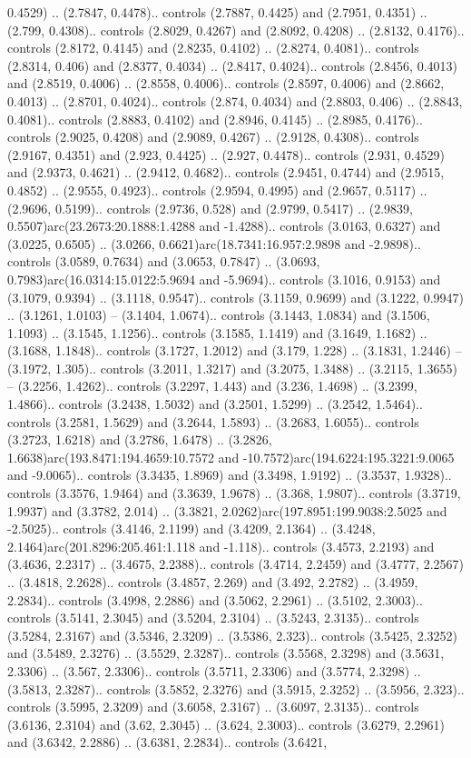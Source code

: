 0.4529) .. (2.7847, 0.4478).. controls (2.7887, 0.4425) and (2.7951, 0.4351) .. (2.799, 0.4308).. controls (2.8029, 0.4267) and (2.8092, 0.4208) .. (2.8132, 0.4176).. controls (2.8172, 0.4145) and (2.8235, 0.4102) .. (2.8274, 0.4081).. controls (2.8314, 0.406) and (2.8377, 0.4034) .. (2.8417, 0.4024).. controls (2.8456, 0.4013) and (2.8519, 0.4006) .. (2.8558, 0.4006).. controls (2.8597, 0.4006) and (2.8662, 0.4013) .. (2.8701, 0.4024).. controls (2.874, 0.4034) and (2.8803, 0.406) .. (2.8843, 0.4081).. controls (2.8883, 0.4102) and (2.8946, 0.4145) .. (2.8985, 0.4176).. controls (2.9025, 0.4208) and (2.9089, 0.4267) .. (2.9128, 0.4308).. controls (2.9167, 0.4351) and (2.923, 0.4425) .. (2.927, 0.4478).. controls (2.931, 0.4529) and (2.9373, 0.4621) .. (2.9412, 0.4682).. controls (2.9451, 0.4744) and (2.9515, 0.4852) .. (2.9555, 0.4923).. controls (2.9594, 0.4995) and (2.9657, 0.5117) .. (2.9696, 0.5199).. controls (2.9736, 0.528) and (2.9799, 0.5417) .. (2.9839, 0.5507)arc(23.2673:20.1888:1.4288 and -1.4288).. controls (3.0163, 0.6327) and (3.0225, 0.6505) .. (3.0266, 0.6621)arc(18.7341:16.957:2.9898 and -2.9898).. controls (3.0589, 0.7634) and (3.0653, 0.7847) .. (3.0693, 0.7983)arc(16.0314:15.0122:5.9694 and -5.9694).. controls (3.1016, 0.9153) and (3.1079, 0.9394) .. (3.1118, 0.9547).. controls (3.1159, 0.9699) and (3.1222, 0.9947) .. (3.1261, 1.0103) -- (3.1404, 1.0674).. controls (3.1443, 1.0834) and (3.1506, 1.1093) .. (3.1545, 1.1256).. controls (3.1585, 1.1419) and (3.1649, 1.1682) .. (3.1688, 1.1848).. controls (3.1727, 1.2012) and (3.179, 1.228) .. (3.1831, 1.2446) -- (3.1972, 1.305).. controls (3.2011, 1.3217) and (3.2075, 1.3488) .. (3.2115, 1.3655) -- (3.2256, 1.4262).. controls (3.2297, 1.443) and (3.236, 1.4698) .. (3.2399, 1.4866).. controls (3.2438, 1.5032) and (3.2501, 1.5299) .. (3.2542, 1.5464).. controls (3.2581, 1.5629) and (3.2644, 1.5893) .. (3.2683, 1.6055).. controls (3.2723, 1.6218) and (3.2786, 1.6478) .. (3.2826, 1.6638)arc(193.8471:194.4659:10.7572 and -10.7572)arc(194.6224:195.3221:9.0065 and -9.0065).. controls (3.3435, 1.8969) and (3.3498, 1.9192) .. (3.3537, 1.9328).. controls (3.3576, 1.9464) and (3.3639, 1.9678) .. (3.368, 1.9807).. controls (3.3719, 1.9937) and (3.3782, 2.014) .. (3.3821, 2.0262)arc(197.8951:199.9038:2.5025 and -2.5025).. controls (3.4146, 2.1199) and (3.4209, 2.1364) .. (3.4248, 2.1464)arc(201.8296:205.461:1.118 and -1.118).. controls (3.4573, 2.2193) and (3.4636, 2.2317) .. (3.4675, 2.2388).. controls (3.4714, 2.2459) and (3.4777, 2.2567) .. (3.4818, 2.2628).. controls (3.4857, 2.269) and (3.492, 2.2782) .. (3.4959, 2.2834).. controls (3.4998, 2.2886) and (3.5062, 2.2961) .. (3.5102, 2.3003).. controls (3.5141, 2.3045) and (3.5204, 2.3104) .. (3.5243, 2.3135).. controls (3.5284, 2.3167) and (3.5346, 2.3209) .. (3.5386, 2.323).. controls (3.5425, 2.3252) and (3.5489, 2.3276) .. (3.5529, 2.3287).. controls (3.5568, 2.3298) and (3.5631, 2.3306) .. (3.567, 2.3306).. controls (3.5711, 2.3306) and (3.5774, 2.3298) .. (3.5813, 2.3287).. controls (3.5852, 2.3276) and (3.5915, 2.3252) .. (3.5956, 2.323).. controls (3.5995, 2.3209) and (3.6058, 2.3167) .. (3.6097, 2.3135).. controls (3.6136, 2.3104) and (3.62, 2.3045) .. (3.624, 2.3003).. controls (3.6279, 2.2961) and (3.6342, 2.2886) .. (3.6381, 2.2834).. controls (3.6421, 
